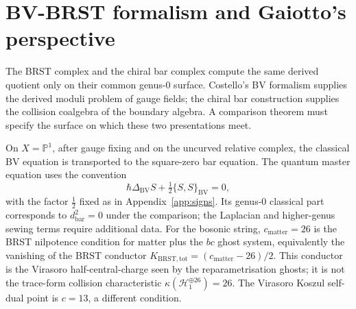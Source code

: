 \chapter{BV-BRST formalism and Gaiotto's perspective}
\label{ch:v1-bv-brst}

The BRST complex and the chiral bar complex compute the same
derived quotient only on their common genus-$0$ surface. Costello's
BV formalism supplies the derived moduli problem of gauge fields;
the chiral bar construction supplies the collision coalgebra of the
boundary algebra. A comparison theorem must specify the surface on
which these two presentations meet.

On $X=\mathbb{P}^1$, after gauge fixing and on the uncurved relative
complex, the classical BV equation is transported to the square-zero
bar equation. The quantum master equation uses the convention
\[
\hbar \Delta_{\mathrm{BV}}S+\tfrac{1}{2}\{S,S\}_{\mathrm{BV}}=0,
\]
with the factor $\tfrac{1}{2}$ fixed as in
Appendix~\ref{app:signs}. Its genus-$0$ classical part
corresponds to $d_{\mathrm{bar}}^2=0$ under the comparison; the
Laplacian and higher-genus sewing terms require additional data.
For the bosonic string, $c_{\mathrm{matter}}=26$ is the BRST
nilpotence condition for matter plus the $bc$ ghost system, equivalently
the vanishing of the BRST conductor
$K_{\mathrm{BRST,tot}}=(c_{\mathrm{matter}}-26)/2$. This conductor is
the Virasoro half-central-charge seen by the reparametrisation ghosts;
it is not the trace-form collision characteristic
$\kappa(\mathcal H^{\oplus 26}_1)=26$. The Virasoro Koszul self-dual
point is $c = 13$, a different condition.

